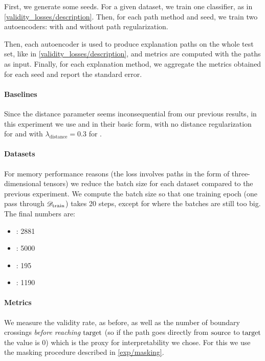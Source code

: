 \documentclass[../main.tex]{subfiles}
\begin{document}
First, we generate some seeds.
For a given dataset, we train one classifier, as in \autoref{validity_losses/description}.
Then, for each path method and seed, we train two autoencoders: with and without path regularization.

Then, each autoencoder is used to produce explanation paths on the whole test set, like in \autoref{validity_losses/description}, and metrics are computed with the paths as input.
Finally, for each explanation method, we aggregate the metrics obtained for each seed and report the standard error.


\paragraph{Baselines}
\label{exp/path_reg/baselines}

Since the distance parameter seems inconsequential from our previous results,
in this experiment we use \ls{} and \revise{} in their basic form, \ie{} with no distance regularization for \ls{} and with $\lambda_\text{distance} = 0.3$ for \revise.

\paragraph{Datasets}

For memory performance reasons (the loss involves paths in the form of three-dimensional tensors) we reduce the batch size for each dataset compared to the previous experiment.
We compute the batch size so that one training epoch (one pass through $\mathscr{D}_\text{train}$) takes 20 steps, except for \ForestCover{} where the batches are still too big.
The final numbers are:
\begin{itemize}
    \item \CakeOnSea: 2881
    \item \ForestCover: 5000
    \item \WineQuality: 195
    \item \OnlineNewsPopularity: 1190
\end{itemize}

\paragraph{Metrics}

We measure the validity rate, as before, as well as the number of boundary crossings \emph{before reaching $\mathrm{target}$} (so if the path goes directly from $\mathrm{source}$ to $\mathrm{target}$ the value is 0) which is the proxy for interpretability we chose.
For this we use the masking procedure described in \autoref{exp/masking}.
\end{document}
